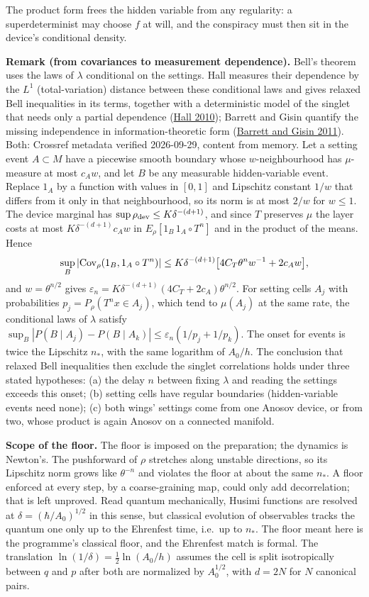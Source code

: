 \documentclass[11pt,a4paper]{article}
\begin{document}
The product form frees the hidden variable from any regularity: a
superdeterminist may choose \(f\) at will, and the conspiracy must then
sit in the device's conditional density.

\textbf{Remark (from covariances to measurement dependence).} Bell's
theorem uses the laws of \(\lambda\) conditional on the settings. Hall
measures their dependence by the \(L^1\) (total-variation) distance
between these conditional laws and gives relaxed Bell inequalities in
its terms, together with a deterministic model of the singlet that needs
only a partial dependence
(\href{https://doi.org/10.1103/PhysRevLett.105.250404}{Hall 2010});
Barrett and Gisin quantify the missing independence in
information-theoretic form
(\href{https://doi.org/10.1103/PhysRevLett.106.100406}{Barrett and Gisin
2011}). Both: Crossref metadata verified 2026-09-29, content from
memory. Let a setting event \(A\subset M\) have a piecewise smooth
boundary whose \(w\)-neighbourhood has \(\mu\)-measure at most \(c_Aw\),
and let \(B\) be any measurable hidden-variable event. Replace \(1_A\)
by a function with values in \([0,1]\) and Lipschitz constant \(1/w\)
that differs from it only in that neighbourhood, so its norm is at most
\(2/w\) for \(w\le1\). The device marginal has
\(\sup\rho_{\rm dev}\le K\delta^{-(d+1)}\), and since \(T\) preserves
\(\mu\) the layer costs at most \(K\delta^{-(d+1)}c_Aw\) in
\(E_\rho[1_B\,1_A\circ T^n]\) and in the product of the means. Hence
\[\sup_B|{\rm Cov}_\rho(1_B,1_A\circ T^n)|\le K\delta^{-(d+1)}\bigl[4C_T\theta^nw^{-1}+2c_Aw\bigr],\]
and \(w=\theta^{n/2}\) gives
\(\varepsilon_n=K\delta^{-(d+1)}(4C_T+2c_A)\theta^{n/2}\). For setting
cells \(A_j\) with probabilities \(p_j=P_\rho(T^nx\in A_j)\), which tend
to \(\mu(A_j)\) at the same rate, the conditional laws of \(\lambda\)
satisfy
\(\sup_B|P(B\mid A_j)-P(B\mid A_k)|\le\varepsilon_n(1/p_j+1/p_k)\). The
onset for events is twice the Lipschitz \(n_*\), with the same logarithm
of \(A_0/h\). The conclusion that relaxed Bell inequalities then exclude
the singlet correlations holds under three stated hypotheses: (a) the
delay \(n\) between fixing \(\lambda\) and reading the settings exceeds
this onset; (b) setting cells have regular boundaries (hidden-variable
events need none); (c) both wings' settings come from one Anosov device,
or from two, whose product is again Anosov on a connected manifold.

\textbf{Scope of the floor.} The floor is imposed on the preparation;
the dynamics is Newton's. The pushforward of \(\rho\) stretches along
unstable directions, so its Lipschitz norm grows like \(\theta^{-n}\)
and violates the floor at about the same \(n_*\). A floor enforced at
every step, by a coarse-graining map, could only add decorrelation; that
is left unproved. Read quantum mechanically, Husimi functions are
resolved at \(\delta=(\hbar/A_0)^{1/2}\) in this sense, but classical
evolution of observables tracks the quantum one only up to the Ehrenfest
time, i.e.~up to \(n_*\). The floor meant here is the programme's
classical floor, and the Ehrenfest match is formal. The translation
\(\ln(1/\delta)=\frac12\ln(A_0/h)\) assumes the cell is split
isotropically between \(q\) and \(p\) after both are normalized by
\(A_0^{1/2}\), with \(d=2N\) for \(N\) canonical pairs.
\end{document}
